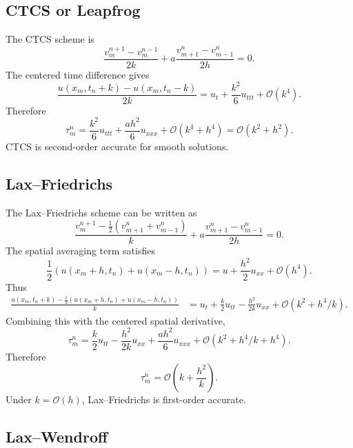 \documentclass[11pt]{article}
\newcommand{\Oh}{\mathcal{O}}
\begin{document}
\subsection{CTCS or Leapfrog}

The CTCS scheme is
\begin{equation}
    \frac{v_m^{n+1}-v_m^{n-1}}{2k}
    +a\frac{v_{m+1}^n-v_{m-1}^n}{2h}=0.
\end{equation}
The centered time difference gives
\begin{equation}
    \frac{u(x_m,t_n+k)-u(x_m,t_n-k)}{2k}
    =
    u_t+\frac{k^2}{6}u_{ttt}+\Oh(k^4).
\end{equation}
Therefore
\begin{equation}
    \tau_m^n
    =
    \frac{k^2}{6}u_{ttt}
    +\frac{a h^2}{6}u_{xxx}
    +\Oh(k^4+h^4)
    =
    \Oh(k^2+h^2).
\end{equation}
CTCS is second-order accurate for smooth solutions.

\subsection{Lax--Friedrichs}

The Lax--Friedrichs scheme can be written as
\begin{equation}
    \frac{v_m^{n+1}-\frac12(v_{m+1}^n+v_{m-1}^n)}{k}
    +a\frac{v_{m+1}^n-v_{m-1}^n}{2h}=0.
\end{equation}
The spatial averaging term satisfies
\begin{equation}
    \frac12\left(u(x_m+h,t_n)+u(x_m-h,t_n)\right)
    =
    u+\frac{h^2}{2}u_{xx}+\Oh(h^4).
\end{equation}
Thus
\begin{align}
    \frac{u(x_m,t_n+k)-\frac12(u(x_m+h,t_n)+u(x_m-h,t_n))}{k}
    &=
    u_t+\frac{k}{2}u_{tt}
    -\frac{h^2}{2k}u_{xx}
    +\Oh(k^2+h^4/k).
\end{align}
Combining this with the centered spatial derivative,
\begin{equation}
    \tau_m^n
    =
    \frac{k}{2}u_{tt}
    -\frac{h^2}{2k}u_{xx}
    +\frac{a h^2}{6}u_{xxx}
    +\Oh(k^2+h^4/k+h^4).
\end{equation}
Therefore
\begin{equation}
    \tau_m^n=\Oh\left(k+\frac{h^2}{k}\right).
\end{equation}
Under $k=\Oh(h)$, Lax--Friedrichs is first-order accurate.

\subsection{Lax--Wendroff}
\end{document}
